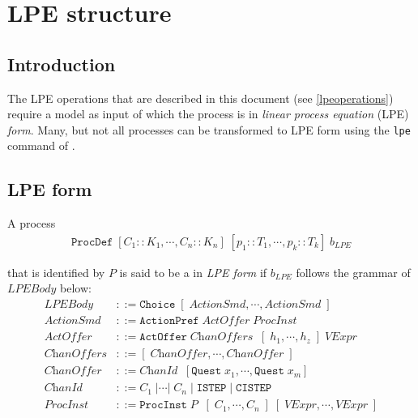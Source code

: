 \chapter{LPE structure}

\section{Introduction}
The LPE operations that are described in this document (see \ref{lpeoperations}) require a \txs{} model as input of which the process is in \emph{linear process equation} (LPE) \emph{form}.
Many, but not all \txs{} processes can be transformed to LPE form using the \texttt{lpe} command of \txs{}.

\section{LPE form} \label{lpeform}

A \txs{} process
\begin{align*}
\texttt{ProcDef} \; [C_1 :: K_1, \cdots{}, C_n :: K_n] \; [p_1 :: T_1, \cdots{}, p_k :: T_k] \; b_\textit{LPE}
\end{align*}

that is identified by $P$ is said to be a in \emph{LPE form} if $b_\textit{LPE}$ follows the grammar of $\textit{LPEBody}$ below:
\begin{align*}
\textit{LPEBody} &::= \texttt{Choice} \; [ \;\! \textit{ActionSmd}, \cdots{}, \textit{ActionSmd} \; ] \\
\textit{ActionSmd} &::= \texttt{ActionPref} \; \textit{ActOffer} \; \textit{ProcInst} \\
\textit{ActOffer} &::= \texttt{ActOffer} \; \textit{ChanOffers} \;\; [ \; h_1, \cdots{}, h_z \; ] \; \textit{VExpr} \\
\textit{ChanOffers} &::= [ \;\! \textit{ChanOffer}, \cdots{}, \textit{ChanOffer} \; ] \\
\textit{ChanOffer} &::= \textit{ChanId} \;\; [\texttt{Quest} \; x_1, \cdots{}, \texttt{Quest} \; x_m] \\
\textit{ChanId} &::= C_1 \;| \cdots{} |\; C_n \;|\; \texttt{ISTEP} \;|\; \texttt{CISTEP} \\
\textit{ProcInst} &::= \texttt{ProcInst} \; P \; \; [ \; C_1, \cdots{}, C_n \; ] \; [\;\!\textit{VExpr}, \cdots{}, \textit{VExpr} \; ]
\end{align*}

